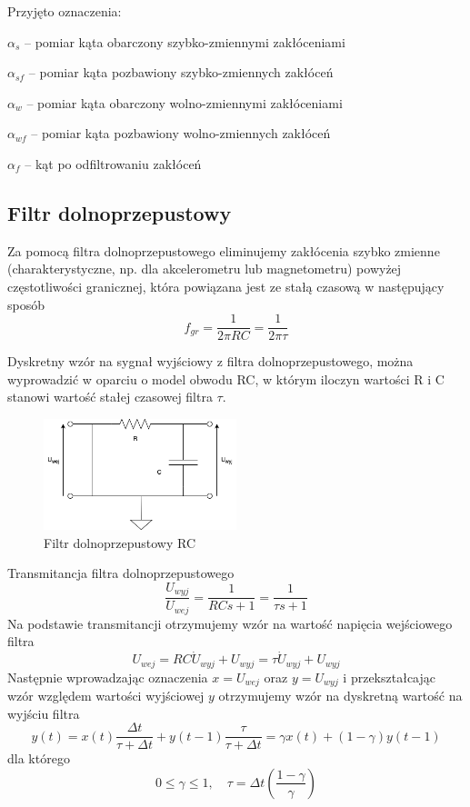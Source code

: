 Przyjęto oznaczenia:

$\alpha_s$ -- pomiar kąta obarczony szybko-zmiennymi zakłóceniami

$\alpha_{sf}$ -- pomiar kąta pozbawiony szybko-zmiennych zakłóceń

$\alpha_w$ -- pomiar kąta obarczony wolno-zmiennymi zakłóceniami

$\alpha_{wf}$ -- pomiar kąta pozbawiony wolno-zmiennych zakłóceń

$\alpha_f$ -- kąt po odfiltrowaniu zakłóceń

\subsection{Filtr dolnoprzepustowy}

Za pomocą filtra dolnoprzepustowego eliminujemy zakłócenia szybko zmienne (charakterystyczne, np. dla akcelerometru lub magnetometru) powyżej częstotliwości granicznej, która powiązana jest ze stałą czasową w następujący sposób
$$
    f_{gr} = \frac{1}{2\pi RC} = \frac{1}{2\pi\tau}
$$

Dyskretny wzór na sygnał wyjściowy z filtra dolnoprzepustowego, można wyprowadzić w oparciu o model obwodu RC, w którym iloczyn wartości R i C stanowi wartość stałej czasowej filtra $\tau$.

\begin{figure}[htb!]
    \centering
    \includegraphics[width=0.5\textwidth]{Rysunki/Rozdzial04/FIltr_dolnoprzepustowy.png}
    \caption{Filtr dolnoprzepustowy RC}
    \label{filtr dp}
\end{figure}

Transmitancja filtra dolnoprzepustowego
$$
    \frac{U_{wyj}}{U_{wej}} = \frac{1}{RCs + 1} = \frac{1}{\tau s + 1}
$$
Na podstawie transmitancji otrzymujemy wzór na wartość napięcia wejściowego filtra
$$
     U_{wej} = RC\Dot{U}_{wyj} + U_{wyj} = \tau \Dot{U}_{wyj} + U_{wyj}
$$
Następnie wprowadzając oznaczenia $x = U_{wej}$ oraz $y = U_{wyj}$ i przekształcając wzór względem wartości wyjściowej $y$ otrzymujemy wzór na dyskretną wartość na wyjściu filtra 
\begin{equation}
    y(t) = x(t)\frac{\Delta t}{\tau + \Delta t} + y(t-1)\frac{\tau}{\tau + \Delta t} = \gamma x(t) + (1 - \gamma)y(t-1)
    \label{wyjscie dp}
\end{equation}
dla którego
$$
    0 \leq \gamma \leq 1,
    \quad
    \tau = \Delta t\left(\frac{1 - \gamma}{\gamma}\right)
$$

